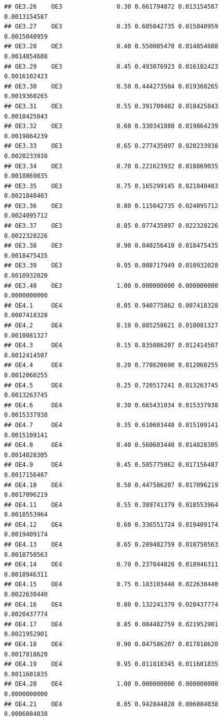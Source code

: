 \documentclass[
]{book}
\begin{document}
\begin{verbatim}
## OE3.26    OE3               0.30 0.661794872 0.013154587 0.0013154587
## OE3.27    OE3               0.35 0.605042735 0.015040959 0.0015040959
## OE3.28    OE3               0.40 0.550085470 0.014854608 0.0014854608
## OE3.29    OE3               0.45 0.493076923 0.016102423 0.0016102423
## OE3.30    OE3               0.50 0.444273504 0.019360265 0.0019360265
## OE3.31    OE3               0.55 0.391709402 0.018425843 0.0018425843
## OE3.32    OE3               0.60 0.330341880 0.019864239 0.0019864239
## OE3.33    OE3               0.65 0.277435897 0.020233938 0.0020233938
## OE3.34    OE3               0.70 0.221623932 0.018869035 0.0018869035
## OE3.35    OE3               0.75 0.165299145 0.021840403 0.0021840403
## OE3.36    OE3               0.80 0.115042735 0.024095712 0.0024095712
## OE3.37    OE3               0.85 0.077435897 0.022328226 0.0022328226
## OE3.38    OE3               0.90 0.040256410 0.018475435 0.0018475435
## OE3.39    OE3               0.95 0.008717949 0.010932020 0.0010932020
## OE3.40    OE3               1.00 0.000000000 0.000000000 0.0000000000
## OE4.1     OE4               0.05 0.940775862 0.007418328 0.0007418328
## OE4.2     OE4               0.10 0.885258621 0.010081327 0.0010081327
## OE4.3     OE4               0.15 0.835086207 0.012414507 0.0012414507
## OE4.4     OE4               0.20 0.778620690 0.012060255 0.0012060255
## OE4.5     OE4               0.25 0.720517241 0.013263745 0.0013263745
## OE4.6     OE4               0.30 0.665431034 0.015337938 0.0015337938
## OE4.7     OE4               0.35 0.610603448 0.015109141 0.0015109141
## OE4.8     OE4               0.40 0.560603448 0.014828305 0.0014828305
## OE4.9     OE4               0.45 0.505775862 0.017156487 0.0017156487
## OE4.10    OE4               0.50 0.447586207 0.017096219 0.0017096219
## OE4.11    OE4               0.55 0.389741379 0.018553964 0.0018553964
## OE4.12    OE4               0.60 0.336551724 0.019409174 0.0019409174
## OE4.13    OE4               0.65 0.289482759 0.018750563 0.0018750563
## OE4.14    OE4               0.70 0.237844828 0.018946311 0.0018946311
## OE4.15    OE4               0.75 0.183103448 0.022630440 0.0022630440
## OE4.16    OE4               0.80 0.132241379 0.020437774 0.0020437774
## OE4.17    OE4               0.85 0.084482759 0.021952901 0.0021952901
## OE4.18    OE4               0.90 0.047586207 0.017818620 0.0017818620
## OE4.19    OE4               0.95 0.011810345 0.011601835 0.0011601835
## OE4.20    OE4               1.00 0.000000000 0.000000000 0.0000000000
## OE4.21    OE4               0.05 0.942844828 0.006084038 0.0006084038

\end{verbatim}
\end{document}
